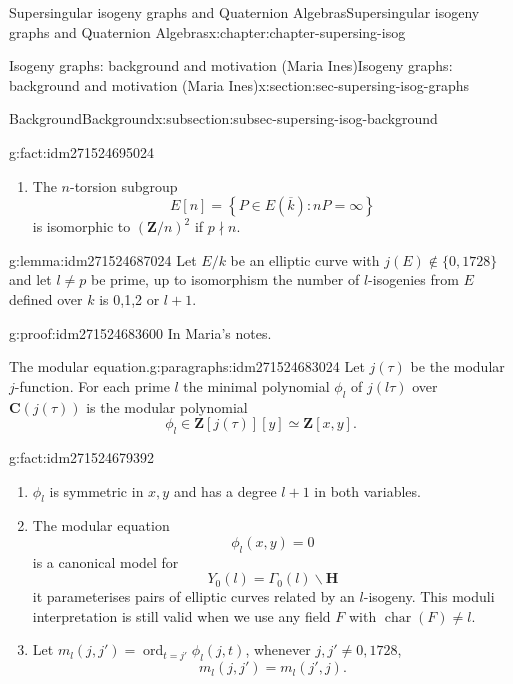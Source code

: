 \documentclass[oneside,10pt,]{book}
\numberwithin{equation}{section}
\newcommand{\lb}{[}
\newcommand{\rb}{]}
\newcommand{\ZZ}{\mathbf{Z}}
\newcommand{\CC}{\mathbf{C}}
\newcommand{\HH}{\mathbf{H}}
\DeclareMathOperator{\characteristic}{char}
\DeclareMathOperator{\ord}{ord}
\begin{document}
\begin{chapterptx}{Supersingular isogeny graphs and Quaternion Algebras}{}{Supersingular isogeny graphs and Quaternion Algebras}{}{}{x:chapter:chapter-supersing-isog}
\begin{sectionptx}{Isogeny graphs: background and motivation (Maria Ines)}{}{Isogeny graphs: background and motivation (Maria Ines)}{}{}{x:section:sec-supersing-isog-graphs}
\begin{subsectionptx}{Background}{}{Background}{}{}{x:subsection:subsec-supersing-isog-background}
\begin{fact}{}{}{g:fact:idm271524695024}
\begin{enumerate}
\begin{equation*}
\end{equation*}
the multiplication-by-\(n \) map.%
\item{}The \(n\)-torsion subgroup%
\begin{equation*}
E\lb n \rb = \left\{ P \in E(\overline k) : nP = \infty\right\}
\end{equation*}
is isomorphic to \((\ZZ/n)^2\) if \(p\nmid n\).%
\end{enumerate}
%
\end{fact}
\begin{lemma}{}{}{g:lemma:idm271524687024}%
Let \(E/k\) be an elliptic curve with \(j(E) \not\in\{0,1728\}\) and let \(l\ne p\) be prime, up to isomorphism the number of \(l\)-isogenies from \(E\) defined over \(k\) is 0,1,2 or \(l+1\).%
\end{lemma}
\begin{proofptx}{}{g:proof:idm271524683600}
In Maria's notes.%
\end{proofptx}
\begin{paragraphs}{The modular equation.}{g:paragraphs:idm271524683024}%
Let \(j(\tau)\) be the modular \(j\)-function. For each prime \(l\) the minimal polynomial \(\phi_l\) of \(j(l\tau)\) over \(\CC (j(\tau))\) is the modular polynomial%
\begin{equation*}
\phi_l \in \ZZ[j(\tau)][y] \simeq \ZZ[x,y]\text{.}
\end{equation*}
%
\begin{fact}{}{}{g:fact:idm271524679392}%
%
\begin{enumerate}
\item{}\(\phi_l\) is symmetric in \(x,y\) and has a degree \(l+1\) in both variables.%
\item{}The modular equation%
\begin{equation*}
\phi_l (x,y) = 0
\end{equation*}
is a canonical model for%
\begin{equation*}
Y_0(l) = \Gamma_0(l) \backslash \HH
\end{equation*}
it parameterises pairs of elliptic curves related by an \(l\)-isogeny. This moduli interpretation is still valid when we use any field \(F\) with \(\characteristic(F) \ne l\).%
\item{}Let \(m_l(j,j') = \ord_{t = j'} \phi_l(j,t)\), whenever \(j,j' \ne 0,1728\),%
\begin{equation*}
m_l(j,j') = m_l(j',j)\text{.}
\end{equation*}
%
\end{enumerate}
%
\end{fact}

\end{paragraphs}
\end{subsectionptx}
\end{sectionptx}
\end{chapterptx}
\end{document}
